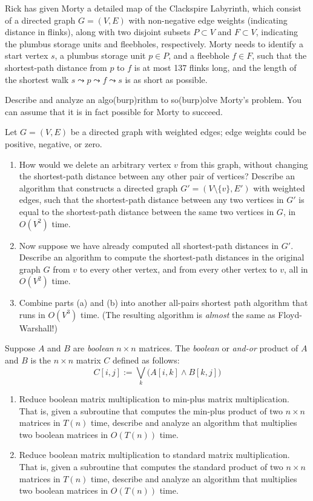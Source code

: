 \begin{exercises}
Rick has given Morty a detailed map of the Clackspire Labyrinth, which consist of a directed graph $G = (V, E)$ with non-negative edge weights (indicating distance in flinks), along with two disjoint subsets $P \subset V$ and $F \subset V$, indicating the plumbus storage units and fleebholes, respectively.
Morty needs to identify a start vertex $s$, a plumbus storage unit $p \in P$, and a fleebhole $f \in F$, such that the shortest-path distance from $p$ to $f$ is at most 137 flinks long, and the length of the shortest walk $s \leadsto p \leadsto f \leadsto s$ is as short as possible.

Describe and analyze an algo(burp)rithm to so(burp)olve Morty’s problem.
You can assume that it is in fact possible for Morty to succeed.

\item Let $G = (V, E)$ be a directed graph with weighted edges; edge weights could be positive, negative, or zero.
\begin{enumerate}
\item How would we delete an arbitrary vertex $v$ from this graph, without changing the shortest-path distance between any other pair of vertices?
Describe an algorithm that constructs a directed graph $G' = (V \setminus \{v\}, E')$ with weighted edges, such that the shortest-path distance between any two vertices in $G'$ is equal to the shortest-path distance between the same two vertices in $G$, in $O(V^2)$ time.
\item Now suppose we have already computed all shortest-path distances in $G'$.
Describe an algorithm to compute the shortest-path distances in the original graph $G$ from $v$ to every other vertex, and from every other vertex to $v$, all in $O(V^2)$ time.
\item Combine parts (a) and (b) into another all-pairs shortest path algorithm that runs in $O(V^3)$ time. (The resulting algorithm is \textit{almost} the same as Floyd-Warshall!)
\end{enumerate}

\item Suppose $A$ and $B$ are \textit{boolean} $n \times n$ matrices.
The \textit{boolean} or \textit{and-or} product of $A$ and $B$ is the $n \times n$ matrix $C$ defined as follows:
\[
C[i, j] := \bigvee_k \bigl(A[i, k] \wedge B[k, j]\bigr)
\]
\begin{enumerate}
\item Reduce boolean matrix multiplication to min-plus matrix multiplication.
That is, given a subroutine  that computes the min-plus product of two $n \times n$ matrices in $T(n)$ time, describe and analyze an algorithm  that multiplies two boolean matrices in $O(T(n))$ time.
\item Reduce boolean matrix multiplication to standard matrix multiplication.
That is, given a subroutine  that computes the standard product of two $n \times n$ matrices in $T(n)$ time, describe and analyze an algorithm  that multiplies two boolean matrices in $O(T(n))$ time.
\end{enumerate}



\end{exercises}
